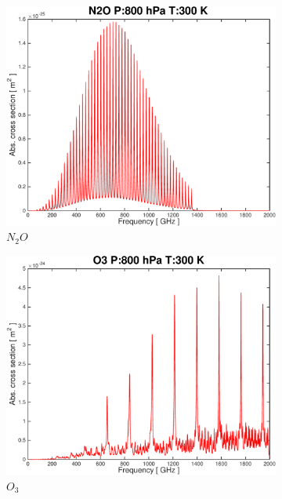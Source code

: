 \documentclass[paper=a4, fontsize=11pt]{scrartcl}
\begin{document}
\begin{figure}[ht]
\begin{subfigure}[b]{0.45\textwidth}
        \includegraphics[width=\textwidth]{plots/plot_xsec_N2O_800hPa_300K.pdf}
        \caption{$N_2O$}
    \end{subfigure}
    \begin{subfigure}[b]{0.45\textwidth}
        \includegraphics[width=\textwidth]{plots/plot_xsec_O3_800hPa_300K.pdf}
        \caption{$O_3$}
    \end{subfigure}
    \begin{subfigure}[b]{0.45\textwidth}

\end{subfigure}
\end{figure}
\end{document}
